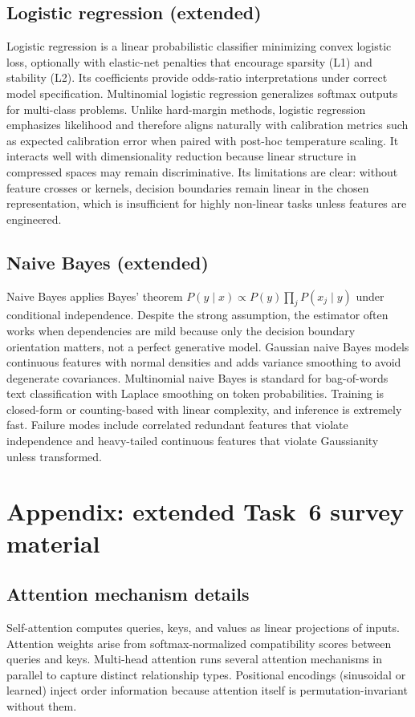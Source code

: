 \documentclass[11pt,a4paper]{article}
\begin{document}
\subsection*{Logistic regression (extended)}
Logistic regression is a linear probabilistic classifier minimizing convex logistic loss, optionally with elastic-net penalties that encourage sparsity (L1) and stability (L2). Its coefficients provide odds-ratio interpretations under correct model specification. Multinomial logistic regression generalizes softmax outputs for multi-class problems. Unlike hard-margin methods, logistic regression emphasizes likelihood and therefore aligns naturally with calibration metrics such as expected calibration error when paired with post-hoc temperature scaling. It interacts well with dimensionality reduction because linear structure in compressed spaces may remain discriminative. Its limitations are clear: without feature crosses or kernels, decision boundaries remain linear in the chosen representation, which is insufficient for highly non-linear tasks unless features are engineered.

\subsection*{Naive Bayes (extended)}
Naive Bayes applies Bayes' theorem $P(y\mid x) \propto P(y)\prod_j P(x_j\mid y)$ under conditional independence. Despite the strong assumption, the estimator often works when dependencies are mild because only the decision boundary orientation matters, not a perfect generative model. Gaussian naive Bayes models continuous features with normal densities and adds variance smoothing to avoid degenerate covariances. Multinomial naive Bayes is standard for bag-of-words text classification with Laplace smoothing on token probabilities. Training is closed-form or counting-based with linear complexity, and inference is extremely fast. Failure modes include correlated redundant features that violate independence and heavy-tailed continuous features that violate Gaussianity unless transformed.

\section{Appendix: extended Task~6 survey material}
\subsection*{Attention mechanism details}
Self-attention computes queries, keys, and values as linear projections of inputs. Attention weights arise from softmax-normalized compatibility scores between queries and keys. Multi-head attention runs several attention mechanisms in parallel to capture distinct relationship types. Positional encodings (sinusoidal or learned) inject order information because attention itself is permutation-invariant without them.
\end{document}
